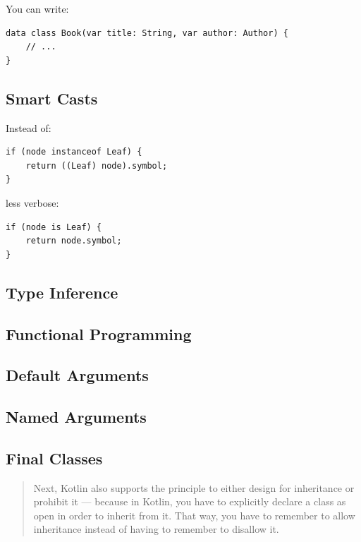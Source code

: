 \documentclass[11pt, a4paper]{report}
\begin{document}
You can write:

\begin{lstlisting}
data class Book(var title: String, var author: Author) {
    // ...
}
\end{lstlisting}

\subsection{Smart Casts}

Instead of:

\begin{lstlisting}
if (node instanceof Leaf) {
    return ((Leaf) node).symbol;
}
\end{lstlisting}

less verbose:

\begin{lstlisting}
if (node is Leaf) {
    return node.symbol;
}
\end{lstlisting}

\subsection{Type Inference}

\subsection{Functional Programming}

\subsection{Default Arguments}

\subsection{Named Arguments}

\subsection{Final Classes}

\begin{quotation}
Next, Kotlin also supports the principle to either design for inheritance or prohibit it — because in Kotlin, you have to explicitly declare a class as open in order to inherit from it. That way, you have to remember to allow inheritance instead of having to remember to disallow it.\cite{kotlin-sommerhoff}
\end{quotation}
\end{document}
